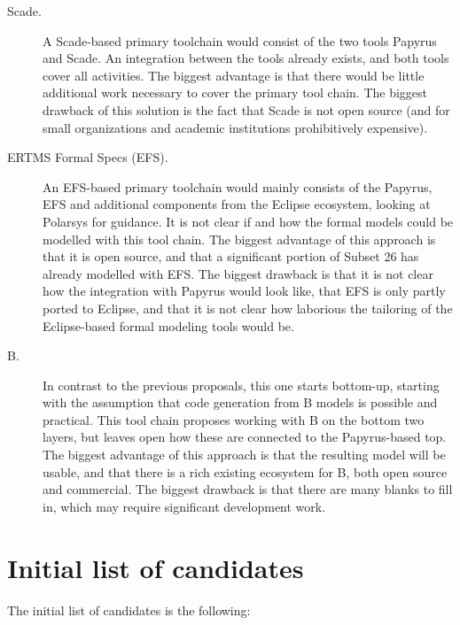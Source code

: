 \begin{description}

\item[Scade.] A Scade-based primary toolchain would consist of the two tools Papyrus and Scade.  An integration between the tools already exists, and both tools cover all activities.  The biggest advantage is that there would be little additional work necessary to cover the primary tool chain.  The biggest drawback of this solution is the fact that Scade is not open source (and for small organizations and academic institutions prohibitively expensive).

\item[ERTMS Formal Specs (EFS).] An EFS-based primary toolchain would mainly consists of the Papyrus, EFS and additional components from the Eclipse ecosystem, looking at Polarsys for guidance.  It is not clear if and how the formal models could be modelled with this tool chain.  The biggest advantage of this approach is that it is open source, and that a significant portion of Subset 26 has already modelled with EFS.  The biggest drawback is that it is not clear how the integration with Papyrus would look like, that EFS is only partly ported to Eclipse, and that it is not clear how laborious the tailoring of the Eclipse-based formal modeling tools would be.

\item[B.] In contrast to the previous proposals, this one starts bottom-up, starting with the assumption that code generation from B models is possible and practical.   This tool chain proposes working with B on the bottom two layers, but leaves open how these are connected to the Papyrus-based top.  The biggest advantage of this approach is that the resulting model will be usable, and that there is a rich existing ecosystem for B, both open source and commercial.  The biggest drawback is that there are many blanks to fill in, which may require significant development work.

\end{description}

\section{Initial  list of candidates}

The initial list of candidates is the following:


